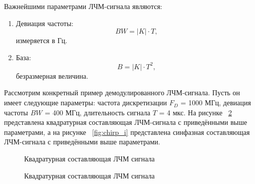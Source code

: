 Важнейшими параметрами ЛЧМ-сигнала являются:

\begin{enumerate}
	\item Девиация частоты: 
\begin{equation}
	BW = |K| \cdot T, 
\end{equation}
измеряется в Гц.
	\item База: 
\begin{equation}
	B = |K| \cdot T^2, 
\end{equation}
безразмерная величина.
\end{enumerate}

Рассмотрим конкретный пример демодулированного ЛЧМ-сигнала. Пусть он имеет следующие параметры: частота дискретизации \(F_{D}\) = 1000 МГц, девиация частоты \(BW\) = 400 МГц, длительность сигнала \(T\) = 4 мкс. На рисунке ~\ref{fig:chirp_q} представлена квадратурная составляющая ЛЧМ-сигнала с приведёнными выше параметрами, а на рисунке ~\ref{fig:chirp_i} представлена синфазная составляющая ЛЧМ-сигнала с приведёнными выше параметрами.

\begin{figure}[h]
    \centering
    \noindent
    \caption{Квадратурная составляющая ЛЧМ сигнала}
    \label{fig:chirp_q}
\end{figure}

\begin{figure}[h]
    \centering
    \noindent
    \caption{Квадратурная составляющая ЛЧМ сигнала}
    \label{fig:chirp_q}
\end{figure}

